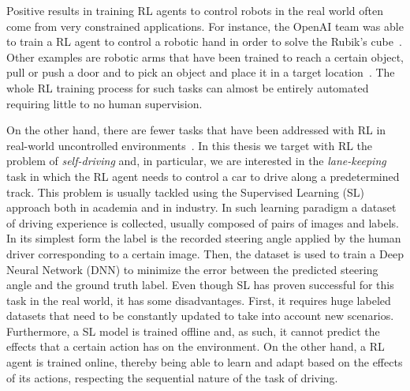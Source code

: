Positive results in training RL agents to control robots in the real world often come from very constrained applications. For instance, the OpenAI team was able to train a RL agent to control a robotic hand in order to solve the Rubik's cube~\cite{rubik}. Other examples are robotic arms that have been trained to reach a certain object, pull or push a door and to pick an object and place it in a target location~\cite{gu2017deep}. The whole RL training process for such tasks can almost be entirely automated requiring little to no human supervision.

On the other hand, there are fewer tasks that have been addressed with RL in real-world uncontrolled environments~\cite{smith2022walk,DBLP:journals/corr/abs-2008-00715}. In this thesis we target with RL the problem of \textit{self-driving} and, in particular, we are interested in the \textit{lane-keeping} task in which the RL agent needs to control a car to drive along a predetermined track. This problem is usually tackled using the Supervised Learning (SL) approach both in academia and in industry. In such learning paradigm a dataset of driving experience is collected, usually composed of pairs of images and labels. In its simplest form the label is the recorded steering angle applied by the human driver corresponding to a certain image. Then, the dataset is used to train a Deep Neural Network (DNN) to minimize the error between the predicted steering angle and the ground truth label. Even though SL has proven successful for this task in the real world, it has some disadvantages. First, it requires huge labeled datasets that need to be constantly updated to take into account new scenarios. Furthermore, a SL model is trained offline and, as such, it cannot predict the effects that a certain action has on the environment. On the other hand, a RL agent is trained online, thereby being able to learn and adapt based on the effects of its actions, respecting the sequential nature of the task of driving.

